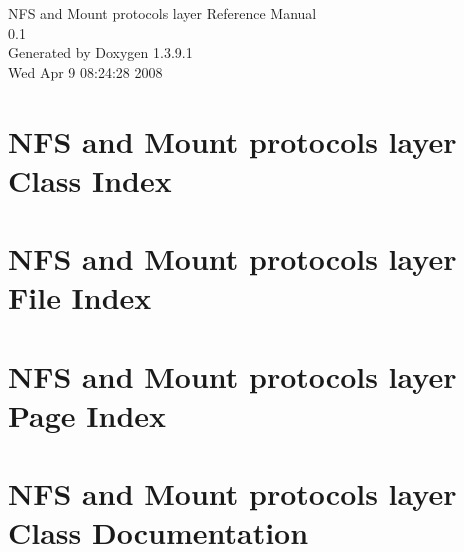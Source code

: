 \documentclass[a4paper]{book}
\begin{document}
\begin{titlepage}
\vspace*{7cm}
\begin{center}
{\Large NFS and Mount protocols layer Reference Manual\\[1ex]\large 0.1 }\\
\vspace*{1cm}
{\large Generated by Doxygen 1.3.9.1}\\
\vspace*{0.5cm}
{\small Wed Apr 9 08:24:28 2008}\\
\end{center}
\end{titlepage}
\clearemptydoublepage
{}
\tableofcontents
\clearemptydoublepage
{}
\chapter{NFS and Mount protocols layer Class Index}

\chapter{NFS and Mount protocols layer File Index}

\chapter{NFS and Mount protocols layer Page Index}

\chapter{NFS and Mount protocols layer Class Documentation}


\end{document}
